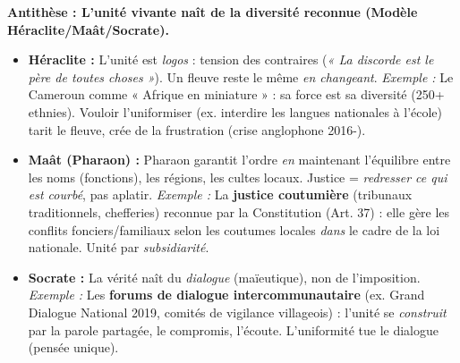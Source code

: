 \documentclass[11pt]{article}
\begin{document}
\begin{exoresolu}
\textbf{Antithèse : L'unité vivante naît de la diversité reconnue (Modèle Héraclite/Maât/Socrate).}\par
\begin{itemize}
    \item \textbf{Héraclite :} L'unité est \emph{logos} : tension des contraires (\emph{« La discorde est le père de toutes choses »}). Un fleuve reste le même \emph{en changeant}. \emph{Exemple :} Le Cameroun comme « Afrique en miniature » : sa force est sa diversité (250+ ethnies). Vouloir l'uniformiser (ex. interdire les langues nationales à l'école) tarit le fleuve, crée de la frustration (crise anglophone 2016-).
    \item \textbf{Maât (Pharaon) :} Pharaon garantit l'ordre \emph{en} maintenant l'équilibre entre les noms (fonctions), les régions, les cultes locaux. Justice = \emph{redresser ce qui est courbé}, pas aplatir. \emph{Exemple :} La \textbf{justice coutumière} (tribunaux traditionnels, chefferies) reconnue par la Constitution (Art. 37) : elle gère les conflits fonciers/familiaux selon les coutumes locales \emph{dans} le cadre de la loi nationale. Unité par \emph{subsidiarité}.
    \item \textbf{Socrate :} La vérité naît du \emph{dialogue} (maïeutique), non de l'imposition. \emph{Exemple :} Les \textbf{forums de dialogue intercommunautaire} (ex. Grand Dialogue National 2019, comités de vigilance villageois) : l'unité se \emph{construit} par la parole partagée, le compromis, l'écoute. L'uniformité tue le dialogue (pensée unique).
\end{itemize}


\end{exoresolu}
\end{document}
